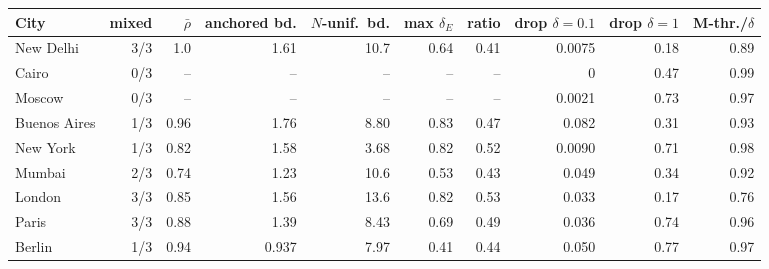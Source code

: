 \begin{tabular}{lrrrrrrrrr}
\toprule
City & mixed & $\bar\rho$ & anchored bd. & $N$-unif.\ bd. & max $\delta_E$ & ratio & drop $\delta{=}0.1$ & drop $\delta{=}1$ & M-thr./$\delta$ \\
\midrule
New Delhi & 3/3 & 1.0 & 1.61 & 10.7 & 0.64 & 0.41 & 0.0075 & 0.18 & 0.89 \\
Cairo & 0/3 & -- & -- & -- & -- & -- & 0 & 0.47 & 0.99 \\
Moscow & 0/3 & -- & -- & -- & -- & -- & 0.0021 & 0.73 & 0.97 \\
Buenos Aires & 1/3 & 0.96 & 1.76 & 8.80 & 0.83 & 0.47 & 0.082 & 0.31 & 0.93 \\
New York & 1/3 & 0.82 & 1.58 & 3.68 & 0.82 & 0.52 & 0.0090 & 0.71 & 0.98 \\
Mumbai & 2/3 & 0.74 & 1.23 & 10.6 & 0.53 & 0.43 & 0.049 & 0.34 & 0.92 \\
London & 3/3 & 0.85 & 1.56 & 13.6 & 0.82 & 0.53 & 0.033 & 0.17 & 0.76 \\
Paris & 3/3 & 0.88 & 1.39 & 8.43 & 0.69 & 0.49 & 0.036 & 0.74 & 0.96 \\
Berlin & 1/3 & 0.94 & 0.937 & 7.97 & 0.41 & 0.44 & 0.050 & 0.77 & 0.97 \\
\bottomrule
\end{tabular}
